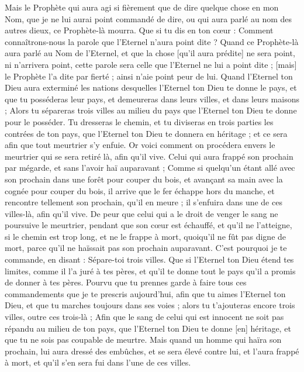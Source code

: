 \begin{multicols}{2}
Mais le Prophète qui aura agi si fièrement que de dire quelque chose en mon Nom, que je ne lui aurai point commandé de dire, ou qui aura parlé au nom des autres dieux, ce Prophète-là mourra.
Que si tu dis en ton cœur : Comment connaîtrons-nous la parole que l'Eternel n'aura point dite ?
Quand ce Prophète-là aura parlé au Nom de l'Eternel, et que la chose [qu'il aura prédite] ne sera point, ni n'arrivera point, cette parole sera celle que l'Eternel ne lui a point dite ; [mais] le Prophète l'a dite par fierté ; ainsi n'aie point peur de lui.
\VerseOne{}Quand l'Eternel ton Dieu aura exterminé les nations desquelles l'Eternel ton Dieu te donne le pays, et que tu posséderas leur pays, et demeureras dans leurs villes, et dans leurs maisons ;
Alors tu sépareras trois villes au milieu du pays que l'Eternel ton Dieu te donne pour le posséder.
Tu dresseras le chemin, et tu diviseras en trois parties les contrées de ton pays, que l'Eternel ton Dieu te donnera en héritage ; et ce sera afin que tout meurtrier s'y enfuie.
Or voici comment on procédera envers le meurtrier qui se sera retiré là, afin qu'il vive. Celui qui aura frappé son prochain par mégarde, et sans l'avoir haï auparavant ;
Comme si quelqu'un étant allé avec son prochain dans une forêt pour couper du bois, et avançant sa main avec la cognée pour couper du bois, il arrive que le fer échappe hors du manche, et rencontre tellement son prochain, qu'il en meure ; il s'enfuira dans une de ces villes-là, afin qu'il vive.
De peur que celui qui a le droit de venger le sang ne poursuive le meurtrier, pendant que son cœur est échauffé, et qu'il ne l'atteigne, si le chemin est trop long, et ne le frappe à mort, quoiqu'il ne fût pas digne de mort, parce qu'il ne haïssait pas son prochain auparavant.
C'est pourquoi je te commande, en disant : Sépare-toi trois villes.
Que si l'Eternel ton Dieu étend tes limites, comme il l'a juré à tes pères, et qu'il te donne tout le pays qu'il a promis de donner à tes pères.
Pourvu que tu prennes garde à faire tous ces commandements que je te prescris aujourd'hui, afin que tu aimes l'Eternel ton Dieu, et que tu marches toujours dans ses voies ; alors tu t'ajouteras encore trois villes, outre ces trois-là ;
Afin que le sang de celui qui est innocent ne soit pas répandu au milieu de ton pays, que l'Eternel ton Dieu te donne [en] héritage, et que tu ne sois pas coupable de meurtre.
Mais quand un homme qui haïra son prochain, lui aura dressé des embûches, et se sera élevé contre lui, et l'aura frappé à mort, et qu'il s'en sera fui dans l'une de ces villes.

\end{multicols}
